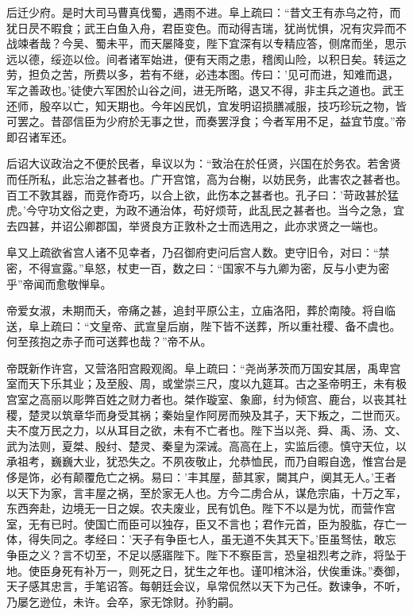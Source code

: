 \documentclass[12pt,UTF8]{ctexbook}
\begin{document}
后迁少府。是时大司马曹真伐蜀，遇雨不进。阜上疏曰：“昔文王有赤乌之符，而犹日昃不暇食；武王白鱼入舟，君臣变色。而动得吉瑞，犹尚忧惧，况有灾异而不战竦者哉？今吴、蜀未平，而天屡降变，陛下宜深有以专精应答，侧席而坐，思示远以德，绥迩以俭。间者诸军始进，便有天雨之患，稽阂山险，以积日矣。转运之劳，担负之苦，所费以多，若有不继，必违本图。传曰：'见可而进，知难而退，军之善政也。'徒使六军困於山谷之间，进无所略，退又不得，非主兵之道也。武王还师，殷卒以亡，知天期也。今年凶民饥，宜发明诏损膳减服，技巧珍玩之物，皆可罢之。昔邵信臣为少府於无事之世，而奏罢浮食；今者军用不足，益宜节度。”帝即召诸军还。

后诏大议政治之不便於民者，阜议以为：“致治在於任贤，兴国在於务农。若舍贤而任所私，此忘治之甚者也。广开宫馆，高为台榭，以妨民务，此害农之甚者也。百工不敦其器，而竞作奇巧，以合上欲，此伤本之甚者也。孔子曰：'苛政甚於猛虎。'今守功文俗之吏，为政不通治体，苟好烦苛，此乱民之甚者也。当今之急，宜去四甚，并诏公卿郡国，举贤良方正敦朴之士而选用之，此亦求贤之一端也。

阜又上疏欲省宫人诸不见幸者，乃召御府吏问后宫人数。吏守旧令，对曰：“禁密，不得宣露。”阜怒，杖吏一百，数之曰：“国家不与九卿为密，反与小吏为密乎”帝闻而愈敬惮阜。

帝爱女淑，未期而夭，帝痛之甚，追封平原公主，立庙洛阳，葬於南陵。将自临送，阜上疏曰：“文皇帝、武宣皇后崩，陛下皆不送葬，所以重社稷、备不虞也。何至孩抱之赤子而可送葬也哉？”帝不从。

帝既新作许宫，又营洛阳宫殿观阁。阜上疏曰：“尧尚茅茨而万国安其居，禹卑宫室而天下乐其业；及至殷、周，或堂崇三尺，度以九筵耳。古之圣帝明王，未有极宫室之高丽以彫弊百姓之财力者也。桀作璇室、象廊，纣为倾宫、鹿台，以丧其社稷，楚灵以筑章华而身受其祸；秦始皇作阿房而殃及其子，天下叛之，二世而灭。夫不度万民之力，以从耳目之欲，未有不亡者也。陛下当以尧、舜、禹、汤、文、武为法则，夏桀、殷纣、楚灵、秦皇为深诫。高高在上，实监后德。慎守天位，以承祖考，巍巍大业，犹恐失之。不夙夜敬止，允恭恤民，而乃自暇自逸，惟宫台是侈是饰，必有颠覆危亡之祸。易曰：'丰其屋，蔀其家，闚其户，阒其无人。'王者以天下为家，言丰屋之祸，至於家无人也。方今二虏合从，谋危宗庙，十万之军，东西奔赴，边境无一日之娱。农夫废业，民有饥色。陛下不以是为忧，而营作宫室，无有已时。使国亡而臣可以独存，臣又不言也；君作元首，臣为股肱，存亡一体，得失同之。孝经曰：'天子有争臣七人，虽无道不失其天下。'臣虽驽怯，敢忘争臣之义？言不切至，不足以感寤陛下。陛下不察臣言，恐皇祖烈考之祚，将坠于地。使臣身死有补万一，则死之日，犹生之年也。谨叩棺沐浴，伏俟重诛。”奏御，天子感其忠言，手笔诏答。每朝廷会议，阜常侃然以天下为己任。数谏争，不听，乃屡乞逊位，未许。会卒，家无馀财。孙豹嗣。
\end{document}
